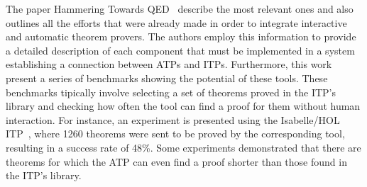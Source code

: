 The paper Hammering Towards QED~\cite{hammering} describe
the most relevant ones and also outlines
all the efforts that were already made in order to integrate
interactive and automatic theorem provers. The authors employ
this information to provide a detailed description of each
component that must be implemented in a system establishing
a connection between ATPs and ITPs. Furthermore, this work
present a series of benchmarks showing the potential of these
tools. These benchmarks tipically involve selecting a set
of theorems proved in the ITP's library and checking how often the
tool can find a proof for them without human interaction.
For instance, an experiment is presented using the Isabelle/HOL ITP~\cite{Nipkow2002}, where
1260 theorems were sent to be proved by the corresponding tool,
resulting in a success rate of 48\%.
Some experiments demonstrated that there are theorems for which
the ATP can even find a proof shorter than those found in the ITP's library.
